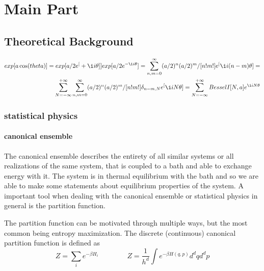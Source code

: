 	
	\chapter{Main Part}
	\section{Theoretical Background}
	\begin{align}
		exp[a \cos(theta)] = exp[a/2 e^[+\i i\theta]] exp[a/2 e^{-\i i\theta}] = \sum_{n,m=0}^\infty (a/2)^n (a/2)^m/[n! m!] e^[\i i (n-m)\theta]
		= \\
		\sum_{N=-\infty}^{+\infty} {\sum_{n,m=0}^\infty (a/2)^n (a/2)^m/[n! m!] \delta_{n-m, N}} e^[\i i N \theta]
		= \sum_{N=-\infty}^{+\infty} BesselI[N, a] e^{\i i N \theta}
	\end{align}
	\subsection{statistical physics}
	\subsubsection{canonical ensemble}
	The canonical ensemble describes the entirety of all similar systems or all realizations of the same system, that is coupled to a bath and able to exchange energy with it. The system is in thermal equilibrium with the bath and so we are able to make some statements about equilibrium properties of the system. A important tool when dealing with the canonical ensemble or statistical physics in general is the partition function.
	
	The partition function can be motivated through multiple ways, but the most common being entropy maximization. The discrete (continuous) canonical partition function is defined as
	\begin{equation}
		Z =	\sum_i e^{-\beta H_i} \qquad \qquad Z =	\frac{1}{h^d} \int e^{-\beta H(q, p)} d^dq d^dp
	\end{equation}
	

